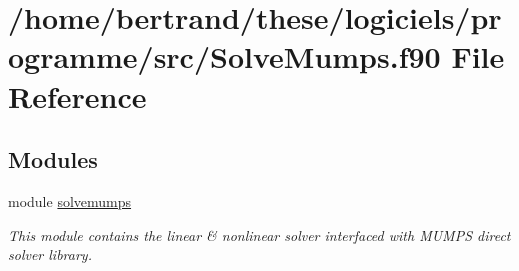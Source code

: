 \hypertarget{_solve_mumps_8f90}{}\section{/home/bertrand/these/logiciels/programme/src/\+Solve\+Mumps.f90 File Reference}
\label{_solve_mumps_8f90}
\subsection*{Modules}
\begin{DoxyCompactItemize}
\item 
module \hyperlink{namespacesolvemumps}{solvemumps}
\begin{DoxyCompactList}\small\item\em This module contains the linear \& nonlinear solver interfaced with M\+U\+M\+PS direct solver library. \end{DoxyCompactList}\end{DoxyCompactItemize}
